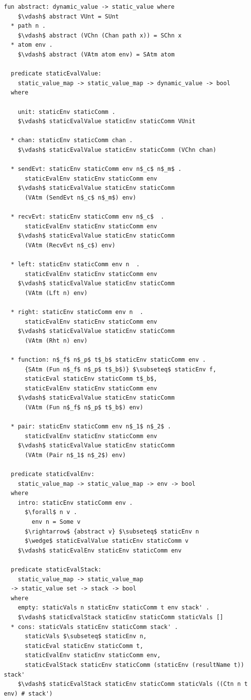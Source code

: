 \documentclass[letterpaper, 11pt]{report}
\begin{document}
\begin{lstlisting}[language=logic, mathescape]
  fun abstract: dynamic_value -> static_value where
    $\vdash$ abstract VUnt = SUnt
  * path n . 
    $\vdash$ abstract (VChn (Chan path x)) = SChn x
  * atom env .
    $\vdash$ abstract (VAtm atom env) = SAtm atom

  predicate staticEvalValue:
    static_value_map -> static_value_map -> dynamic_value -> bool
  where

    unit: staticEnv staticComm .
    $\vdash$ staticEvalValue staticEnv staticComm VUnit

  * chan: staticEnv staticComm chan .
    $\vdash$ staticEvalValue staticEnv staticComm (VChn chan)

  * sendEvt: staticEnv staticComm env n$_c$ n$_m$ .
      staticEvalEnv staticEnv staticComm env
    $\vdash$ staticEvalValue staticEnv staticComm
      (VAtm (SendEvt n$_c$ n$_m$) env)

  * recvEvt: staticEnv staticComm env n$_c$  .
      staticEvalEnv staticEnv staticComm env
    $\vdash$ staticEvalValue staticEnv staticComm
      (VAtm (RecvEvt n$_c$) env)

  * left: staticEnv staticComm env n  .
      staticEvalEnv staticEnv staticComm env
    $\vdash$ staticEvalValue staticEnv staticComm
      (VAtm (Lft n) env)

  * right: staticEnv staticComm env n  .
      staticEvalEnv staticEnv staticComm env
    $\vdash$ staticEvalValue staticEnv staticComm
      (VAtm (Rht n) env)

  * function: n$_f$ n$_p$ t$_b$ staticEnv staticComm env .
      {SAtm (Fun n$_f$ n$_p$ t$_b$)} $\subseteq$ staticEnv f, 
      staticEval staticEnv staticComm t$_b$, 
      staticEvalEnv staticEnv staticComm env
    $\vdash$ staticEvalValue staticEnv staticComm
      (VAtm (Fun n$_f$ n$_p$ t$_b$) env)

  * pair: staticEnv staticComm env n$_1$ n$_2$ .
      staticEvalEnv staticEnv staticComm env
    $\vdash$ staticEvalValue staticEnv staticComm
      (VAtm (Pair n$_1$ n$_2$) env)

  predicate staticEvalEnv:
    static_value_map -> static_value_map -> env -> bool
  where 
    intro: staticEnv staticComm env .
      $\forall$ n v .
        env n = Some v 
      $\rightarrow$ {abstract v} $\subseteq$ staticEnv n
      $\wedge$ staticEvalValue staticEnv staticComm v
    $\vdash$ staticEvalEnv staticEnv staticComm env

  predicate staticEvalStack:
    static_value_map -> static_value_map 
  -> static_value set -> stack -> bool 
  where
    empty: staticVals n staticEnv staticComm t env stack' .
    $\vdash$ staticEvalStack staticEnv staticComm staticVals []
  * cons: staticVals staticEnv staticComm stack' . 
      staticVals $\subseteq$ staticEnv n,
      staticEval staticEnv staticComm t,
      staticEvalEnv staticEnv staticComm env,
      staticEvalStack staticEnv staticComm (staticEnv (resultName t)) stack' 
    $\vdash$ staticEvalStack staticEnv staticComm staticVals ((Ctn n t env) # stack')


\end{lstlisting}
\end{document}
